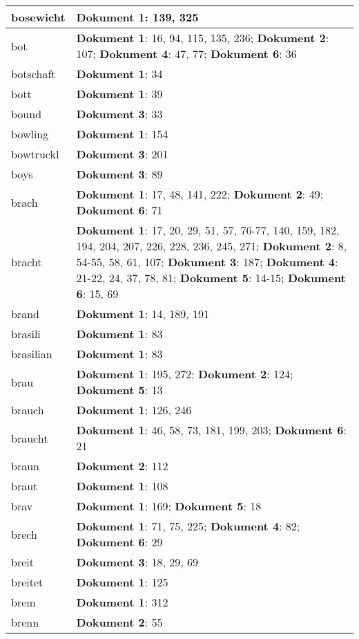 \documentclass[a5paper]{article}
\begin{document}
\begin{longtable}[l]{|l|p{3in}|}
\hline
bosewicht & \textbf{Dokument 1}: 139, 325 \\
\hline
bot & \textbf{Dokument 1}: 16, 94, 115, 135, 236; \textbf{Dokument 2}: 107; \textbf{Dokument 4}: 47, 77; \textbf{Dokument 6}: 36 \\
\hline
botschaft & \textbf{Dokument 1}: 34 \\
\hline
bott & \textbf{Dokument 1}: 39 \\
\hline
bound & \textbf{Dokument 3}: 33 \\
\hline
bowling & \textbf{Dokument 1}: 154 \\
\hline
bowtruckl & \textbf{Dokument 3}: 201 \\
\hline
boys & \textbf{Dokument 3}: 89 \\
\hline
brach & \textbf{Dokument 1}: 17, 48, 141, 222; \textbf{Dokument 2}: 49; \textbf{Dokument 6}: 71 \\
\hline
bracht & \textbf{Dokument 1}: 17, 20, 29, 51, 57, 76-77, 140, 159, 182, 194, 204, 207, 226, 228, 236, 245, 271; \textbf{Dokument 2}: 8, 54-55, 58, 61, 107; \textbf{Dokument 3}: 187; \textbf{Dokument 4}: 21-22, 24, 37, 78, 81; \textbf{Dokument 5}: 14-15; \textbf{Dokument 6}: 15, 69 \\
\hline
brand & \textbf{Dokument 1}: 14, 189, 191 \\
\hline
brasili & \textbf{Dokument 1}: 83 \\
\hline
brasilian & \textbf{Dokument 1}: 83 \\
\hline
brau & \textbf{Dokument 1}: 195, 272; \textbf{Dokument 2}: 124; \textbf{Dokument 5}: 13 \\
\hline
brauch & \textbf{Dokument 1}: 126, 246 \\
\hline
braucht & \textbf{Dokument 1}: 46, 58, 73, 181, 199, 203; \textbf{Dokument 6}: 21 \\
\hline
braun & \textbf{Dokument 2}: 112 \\
\hline
braut & \textbf{Dokument 1}: 108 \\
\hline
brav & \textbf{Dokument 1}: 169; \textbf{Dokument 5}: 18 \\
\hline
brech & \textbf{Dokument 1}: 71, 75, 225; \textbf{Dokument 4}: 82; \textbf{Dokument 6}: 29 \\
\hline
breit & \textbf{Dokument 3}: 18, 29, 69 \\
\hline
breitet & \textbf{Dokument 1}: 125 \\
\hline
brem & \textbf{Dokument 1}: 312 \\
\hline
brenn & \textbf{Dokument 2}: 55 \\

\end{longtable}
\end{document}
